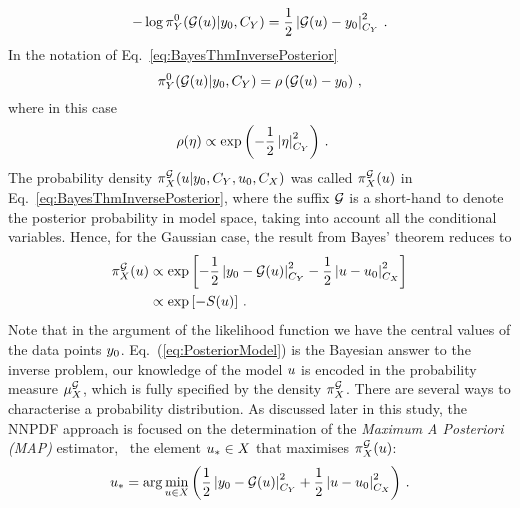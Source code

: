 \begin{equation}
  \label{eq:LikelyChiSq}
  -\log\pi_{Y}^0(\mathcal{G}(u)|y_0,C_{Y}) =  
      \frac12 \left|
      \mathcal{G}(u) - y_0
      \right|_{C_{Y}}^2
    \, .
\end{equation}
In the notation of Eq.~\ref{eq:BayesThmInversePosterior}
\begin{equation}
  \label{eq:IdentifyRho}
  \pi_{Y}^0(\mathcal{G}(u)|y_0,C_{Y}) = \rho\left(
    \mathcal{G}(u) - y_0
  \right)\, ,
\end{equation}
where in this case 
\begin{align}
  \label{eq:RhoGauss}
  \rho(\eta) &\propto \exp\left(
               -\frac12 \left|\eta\right|_{C_{Y}}^2
               \right)\, .
\end{align}
The probability density $\pi^{\mathcal{G}}_{X}(u|y_0,
C_{Y},u_0,C_X)$ was called
$\pi_{X}^{\mathcal{G}}(u)$ in Eq.~\ref{eq:BayesThmInversePosterior}, where
the suffix $\mathcal{G}$ is a short-hand to denote the posterior probability in
model space, taking into account all the conditional variables. Hence, for the
Gaussian case, the result from Bayes' theorem reduces to
\begin{align}
  \label{eq:PosteriorModel}
  \pi_{X}^{\mathcal{G}}(u) 
  &\propto 
  \exp\left[
    -\frac12 \left| y_0 - \mathcal{G}(u) \right|_{C_{Y}} ^2
    -\frac12 \left| u - u_0 \right|_{C_X}^2
  \right] \\ 
  &\propto
  \exp\left[
    - S(u)
  \right]\, .
\end{align}
Note that in the argument of the likelihood function we have the central values
of the data points $y_0$. Eq.~(\ref{eq:PosteriorModel}) is the
Bayesian answer to the inverse problem, our knowledge of the model $u$
is encoded in the probability measure $\mu_{X}^{\mathcal{G}}$, which is fully
specified by the density $\pi_{X}^{\mathcal{G}}$. There are several ways to
characterise a probability distribution. As discussed later in this study, the
NNPDF approach is focused on the determination of the {\em Maximum A Posteriori
(MAP)} estimator, \ie\ the element $u_* \in X$ that maximises
$\pi_{X}^{\mathcal{G}}(u)$:
\begin{align}
  \label{eq:MAP}
  u_* = \arg\min_{u \in X} 
  \left(
    \frac12 \left| y_0 - \mathcal{G}(u) \right|_{C_{Y}}^2
    + \frac12 \left| u - u_0 \right|_{C_X}^2
  \right)\, .
\end{align}
